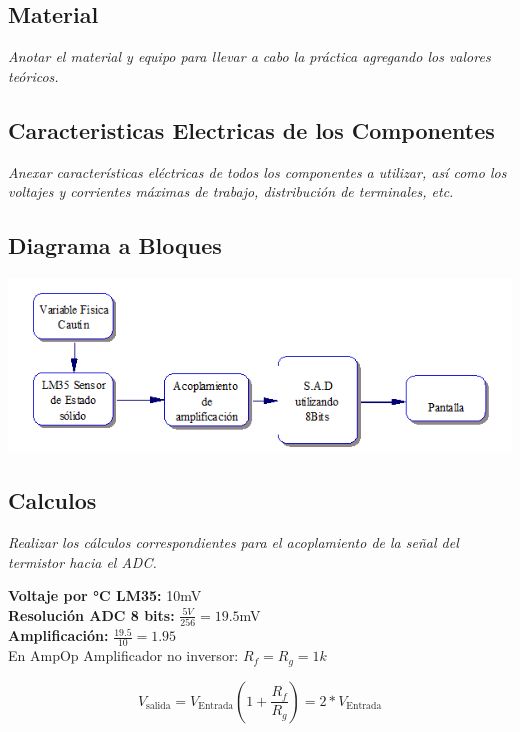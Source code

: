 \documentclass[11pt]{scrartcl}
\newcommand{\indicacion}[1]{\noindent\textit{\small #1}}
\begin{document}
\subsection{Material}

\indicacion{
Anotar el material y equipo para llevar a cabo la práctica agregando los valores teóricos.}

\subsection{Caracteristicas Electricas de los Componentes}
\indicacion{
   Anexar características eléctricas de todos los componentes a utilizar, así como los voltajes y corrientes máximas de trabajo, distribución de terminales, etc.
}




\subsection{Diagrama a Bloques}

\begin{center}
    \includegraphics{DiagramaBloques.png}
\end{center}


\subsection{Calculos}
\indicacion{
Realizar los cálculos correspondientes para el acoplamiento de la señal del termistor hacia el ADC.
}

\textbf{Voltaje por °C LM35: } 10mV \\

\textbf{Resolución ADC 8 bits:  } $\frac{5V}{256}=19.5$mV \\

\textbf{Amplificación: } $\frac{19.5}{10}=1.95$ \\

En AmpOp Amplificador no inversor: 
$R_f=R_g=1k$

\[V_{\text{salida}} = V_{\text{Entrada}} ( 1+ \frac{R_f}{R_g})=2*V_{\text{Entrada}}\]
\end{document}
